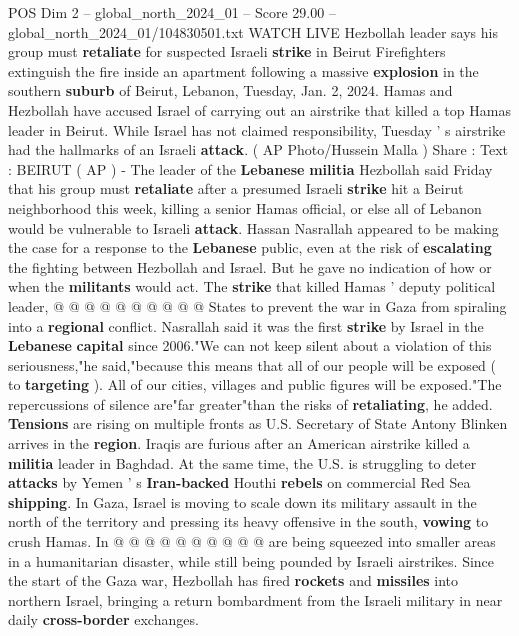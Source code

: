 \begin{textsample}{POS Dim 2 – global\_north\_2024\_01 – Score 29.00 – global\_north\_2024\_01/104830501.txt}  \label{ex:f2_pos_106}
WATCH LIVE Hezbollah leader says his group must \textbf{retaliate} for suspected Israeli \textbf{strike} in Beirut Firefighters extinguish the fire inside an apartment following a massive \textbf{explosion} in the southern \textbf{suburb} of Beirut, Lebanon, Tuesday, Jan. 2, 2024.
Hamas and Hezbollah have accused Israel of carrying out an airstrike that killed a top Hamas leader in Beirut.
While Israel has not claimed responsibility, Tuesday ' s airstrike had the hallmarks of an Israeli \textbf{attack}. ( AP Photo/Hussein Malla ) Share : Text : BEIRUT ( AP ) - The leader of the \textbf{Lebanese} \textbf{militia} Hezbollah said Friday that his group must \textbf{retaliate} after a presumed Israeli \textbf{strike} hit a Beirut neighborhood this week, killing a senior Hamas official, or else all of Lebanon would be vulnerable to Israeli \textbf{attack}.
Hassan Nasrallah appeared to be making the case for a response to the \textbf{Lebanese} public, even at the risk of \textbf{escalating} the fighting between Hezbollah and Israel.
But he gave no indication of how or when the \textbf{militants} would act.
The \textbf{strike} that killed Hamas ' deputy political leader, @ @ @ @ @ @ @ @ @ @ States to prevent the war in Gaza from spiraling into a \textbf{regional} conflict.
Nasrallah said it was the first \textbf{strike} by Israel in the \textbf{Lebanese} \textbf{capital} since 2006."We can not keep silent about a violation of this seriousness,"he said,"because this means that all of our people will be exposed ( to \textbf{targeting} ).
All of our cities, villages and public figures will be exposed."The repercussions of silence are"far greater"than the risks of \textbf{retaliating}, he added. \textbf{Tensions} are rising on multiple fronts as U.S.
Secretary of State Antony Blinken arrives in the \textbf{region}.
Iraqis are furious after an American airstrike killed a \textbf{militia} leader in Baghdad.
At the same time, the U.S. is struggling to deter \textbf{attacks} by Yemen ' s \textbf{Iran-backed} Houthi \textbf{rebels} on commercial Red Sea \textbf{shipping}.
In Gaza, Israel is moving to scale down its military assault in the north of the territory and pressing its heavy offensive in the south, \textbf{vowing} to crush Hamas.
In @ @ @ @ @ @ @ @ @ @ are being squeezed into smaller areas in a humanitarian disaster, while still being pounded by Israeli airstrikes.
Since the start of the Gaza war, Hezbollah has fired \textbf{rockets} and \textbf{missiles} into northern Israel, bringing a return bombardment from the Israeli military in near daily \textbf{cross-border} exchanges.

\end{textsample}
